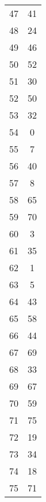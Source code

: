 \begin{table}
\begin{tabular}{c c }
47 & 41 \\
48 & 24 \\
49 & 46 \\
50 & 52 \\
51 & 30 \\
52 & 50 \\
53 & 32 \\
54 & 0 \\
55 & 7 \\
56 & 40 \\
57 & 8 \\
58 & 65 \\
59 & 70 \\
60 & 3 \\
61 & 35 \\
62 & 1 \\
63 & 5 \\
64 & 43 \\
65 & 58 \\
66 & 44 \\
67 & 69 \\
68 & 33 \\
69 & 67 \\
70 & 59 \\
71 & 75 \\
72 & 19 \\
73 & 34 \\
74 & 18 \\
75 & 71 \\
\hline
\end{tabular}
\end{table}